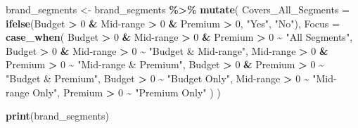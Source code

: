 \documentclass[
]{article}
\newenvironment{Shaded}{\begin{snugshade}}{\end{snugshade}}
\newcommand{\AttributeTok}[1]{\textcolor[rgb]{0.13,0.29,0.53}{#1}}
\newcommand{\DecValTok}[1]{\textcolor[rgb]{0.00,0.00,0.81}{#1}}
\newcommand{\FunctionTok}[1]{\textcolor[rgb]{0.13,0.29,0.53}{\textbf{#1}}}
\newcommand{\NormalTok}[1]{#1}
\newcommand{\OtherTok}[1]{\textcolor[rgb]{0.56,0.35,0.01}{#1}}
\newcommand{\SpecialCharTok}[1]{\textcolor[rgb]{0.81,0.36,0.00}{\textbf{#1}}}
\newcommand{\StringTok}[1]{\textcolor[rgb]{0.31,0.60,0.02}{#1}}
\begin{document}
\begin{Shaded}
\begin{Highlighting}[]
\NormalTok{brand\_segments }\OtherTok{\textless{}{-}}\NormalTok{ brand\_segments }\SpecialCharTok{\%\textgreater{}\%}
  \FunctionTok{mutate}\NormalTok{(}
    \AttributeTok{Covers\_All\_Segments =} \FunctionTok{ifelse}\NormalTok{(Budget }\SpecialCharTok{\textgreater{}} \DecValTok{0} \SpecialCharTok{\&} \StringTok{\textasciigrave{}}\AttributeTok{Mid{-}range}\StringTok{\textasciigrave{}} \SpecialCharTok{\textgreater{}} \DecValTok{0} \SpecialCharTok{\&}\NormalTok{ Premium }\SpecialCharTok{\textgreater{}} \DecValTok{0}\NormalTok{, }\StringTok{"Yes"}\NormalTok{, }\StringTok{"No"}\NormalTok{),}
    \AttributeTok{Focus =} \FunctionTok{case\_when}\NormalTok{(}
\NormalTok{      Budget }\SpecialCharTok{\textgreater{}} \DecValTok{0} \SpecialCharTok{\&} \StringTok{\textasciigrave{}}\AttributeTok{Mid{-}range}\StringTok{\textasciigrave{}} \SpecialCharTok{\textgreater{}} \DecValTok{0} \SpecialCharTok{\&}\NormalTok{ Premium }\SpecialCharTok{\textgreater{}} \DecValTok{0} \SpecialCharTok{\textasciitilde{}} \StringTok{"All Segments"}\NormalTok{,}
\NormalTok{      Budget }\SpecialCharTok{\textgreater{}} \DecValTok{0} \SpecialCharTok{\&} \StringTok{\textasciigrave{}}\AttributeTok{Mid{-}range}\StringTok{\textasciigrave{}} \SpecialCharTok{\textgreater{}} \DecValTok{0} \SpecialCharTok{\textasciitilde{}} \StringTok{"Budget \& Mid{-}range"}\NormalTok{,}
      \StringTok{\textasciigrave{}}\AttributeTok{Mid{-}range}\StringTok{\textasciigrave{}} \SpecialCharTok{\textgreater{}} \DecValTok{0} \SpecialCharTok{\&}\NormalTok{ Premium }\SpecialCharTok{\textgreater{}} \DecValTok{0} \SpecialCharTok{\textasciitilde{}} \StringTok{"Mid{-}range \& Premium"}\NormalTok{,}
\NormalTok{      Budget }\SpecialCharTok{\textgreater{}} \DecValTok{0} \SpecialCharTok{\&}\NormalTok{ Premium }\SpecialCharTok{\textgreater{}} \DecValTok{0} \SpecialCharTok{\textasciitilde{}} \StringTok{"Budget \& Premium"}\NormalTok{,}
\NormalTok{      Budget }\SpecialCharTok{\textgreater{}} \DecValTok{0} \SpecialCharTok{\textasciitilde{}} \StringTok{"Budget Only"}\NormalTok{,}
      \StringTok{\textasciigrave{}}\AttributeTok{Mid{-}range}\StringTok{\textasciigrave{}} \SpecialCharTok{\textgreater{}} \DecValTok{0} \SpecialCharTok{\textasciitilde{}} \StringTok{"Mid{-}range Only"}\NormalTok{,}
\NormalTok{      Premium }\SpecialCharTok{\textgreater{}} \DecValTok{0} \SpecialCharTok{\textasciitilde{}} \StringTok{"Premium Only"}
\NormalTok{    )}
\NormalTok{  )}

\FunctionTok{print}\NormalTok{(brand\_segments)}
\end{Highlighting}
\end{Shaded}
\end{document}
